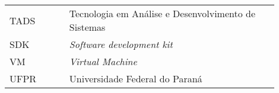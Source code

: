 

\begin{listaacron}

\begin{longtable}[l]{p{0.2\linewidth}p{0.7\linewidth}}
TADS & Tecnologia em Análise e Desenvolvimento de Sistemas\\
SDK & \emph{Software development kit}\\
VM & \emph{Virtual Machine}\\
UFPR & Universidade Federal do Paraná\\
\end{longtable}

\end{listaacron}

